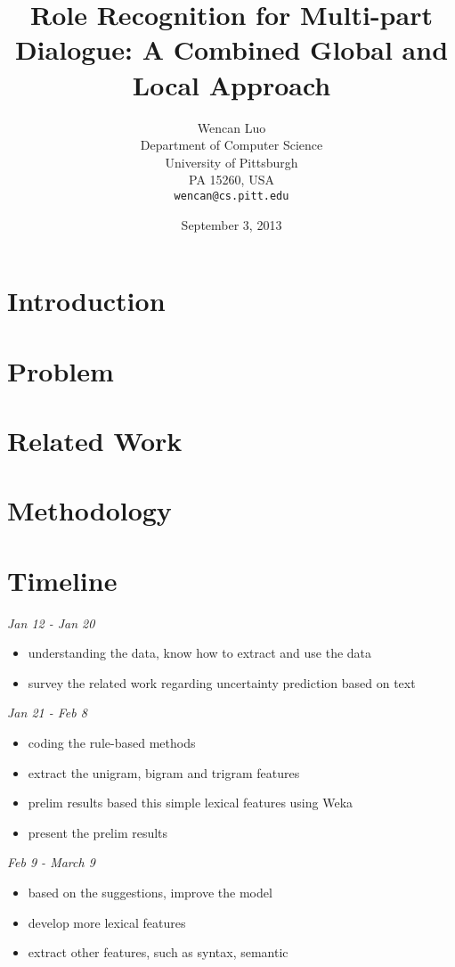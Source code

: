 \documentclass[11pt,letterpaper]{article}
\title{Role Recognition for Multi-part Dialogue: A Combined Global and Local Approach}
\author{Wencan Luo\\
	    Department of Computer Science\\
	    University of Pittsburgh\\
	    PA 15260, USA\\
	    {\tt wencan@cs.pitt.edu}
	  }
\date{September 3, 2013}
\begin{document}
\maketitle
\begin{abstract}
  
\end{abstract}

\section{Introduction}


\section{Problem}


\section{Related Work}

\section{Methodology}

\section{Timeline}

\noindent \emph{Jan 12 - Jan 20}
\begin{itemize}
  \item understanding the data, know how to extract and use the data
  \item survey the related work regarding uncertainty prediction based on text
\end{itemize}

\noindent \emph{Jan 21 - Feb 8}
\begin{itemize}
  \item coding the rule-based methods
  \item extract the unigram, bigram and trigram features
  \item prelim results based this simple lexical features using Weka
  \item present the prelim results
\end{itemize}

\noindent \emph{Feb 9 - March 9}
\begin{itemize}
  \item based on the suggestions, improve the model
  \item develop more lexical features
  \item extract other features, such as syntax, semantic
\end{itemize}
\end{document}

